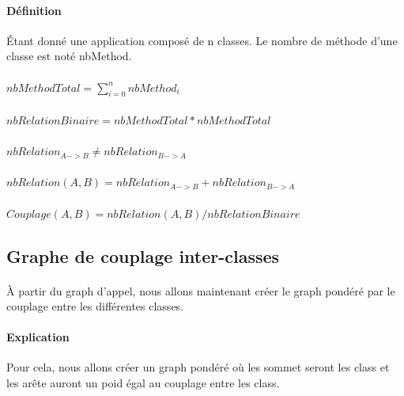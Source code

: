 \documentclass[a4paper]{article}
\begin{document}
\begin{multicols}{2}
        \paragraph{Définition} Étant donné une application composé de n classes. Le nombre de méthode d'une classe est noté nbMethod.
        \\
        \\
        \begin{math}
            nbMethodTotal = \sum_{i=0}^n nbMethod_{i}
        \end{math}
        \\
        \\
        \begin{math}
            nbRelationBinaire = nbMethodTotal*nbMethodTotal
        \end{math}
        \\
        \\
        \begin{math}
            nbRelation_{A->B} \neq nbRelation_{B->A}
        \end{math}
        \\
        \\
        \begin{math}
            nbRelation(A,B) = nbRelation_{A->B} + nbRelation_{B->A}
        \end{math}
        \\
        \\
        \begin{math}
            Couplage(A,B) = nbRelation(A,B) / nbRelationBinaire
        \end{math}
        \subsection{Graphe de couplage inter-classes}

        \paragraph{} À partir du graph d'appel, nous allons maintenant créer le graph pondéré par le couplage entre les différentes classes.

        \paragraph{Explication} Pour cela, nous allons créer un graph pondéré où les sommet seront les class et les arête auront un poid égal au couplage entre les class.


\end{multicols}
\end{document}
